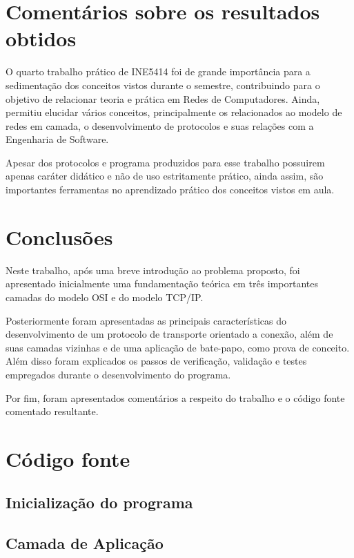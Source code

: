 \documentclass[brazil,times,12pt]{abnt}
\begin{document}
\section*{Comentários sobre os resultados obtidos}
	O quarto trabalho prático de INE5414 foi de grande importância para a
	sedimentação dos conceitos vistos durante o semestre, contribuindo para o
	objetivo de relacionar teoria e prática em Redes de Computadores. Ainda,
	permitiu elucidar vários conceitos, principalmente os relacionados ao modelo de
	redes em camada, o desenvolvimento de protocolos e suas relações com a
	Engenharia de Software.
	
	Apesar dos protocolos e programa produzidos para esse trabalho possuirem apenas
	caráter didático e não de uso estritamente prático, ainda assim, são
	importantes ferramentas no aprendizado prático dos conceitos vistos em aula.

\section*{Conclusões}
	Neste trabalho, após uma breve introdução ao problema proposto, foi apresentado
	inicialmente uma fundamentação teórica em três importantes camadas do modelo
	OSI e do modelo TCP/IP. 
		
	Posteriormente foram apresentadas as principais características do
	desenvolvimento de um protocolo de transporte orientado a conexão, além de
	suas camadas vizinhas e de uma aplicação de bate-papo, como prova de conceito.
	Além disso foram explicados os passos de verificação, validação e testes
	empregados durante o desenvolvimento do programa.
	
	Por fim, foram apresentados comentários a respeito do trabalho e o código fonte
	comentado resultante. 
	
\section*{Código fonte}
	\subsection*{Inicialização do programa}
	
	
	\subsection*{Camada de Aplicação}
	
	
\end{document}
